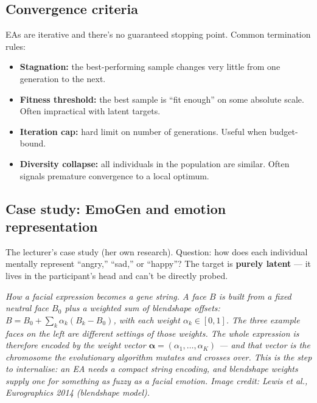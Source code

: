 \documentclass[11pt, a4paper]{article}
\begin{document}
\subsection{Convergence criteria}

EAs are iterative and there's no guaranteed stopping point. Common termination rules:

\begin{itemize}
  \item \textbf{Stagnation:} the best-performing sample changes very little from one generation to the next.
  \item \textbf{Fitness threshold:} the best sample is ``fit enough'' on some absolute scale. Often impractical with latent targets.
  \item \textbf{Iteration cap:} hard limit on number of generations. Useful when budget-bound.
  \item \textbf{Diversity collapse:} all individuals in the population are similar. Often signals premature convergence to a local optimum.
\end{itemize}

\subsection{Case study: EmoGen and emotion representation}

The lecturer's case study (her own research). Question: how does each individual mentally represent ``angry,'' ``sad,'' or ``happy''? The target is \textbf{purely latent} — it lives in the participant's head and can't be directly probed.

\begin{center}

\footnotesize\textit{How a facial expression becomes a \emph{gene string}. A face $B$ is built from a fixed neutral face $B_0$ plus a weighted sum of blendshape offsets: $B = B_0 + \sum_k \alpha_k(B_k - B_0)$, with each weight $\alpha_k \in [0,1]$. The three example faces on the left are different settings of those weights. The whole expression is therefore encoded by the weight vector $\boldsymbol{\alpha}=(\alpha_1,\dots,\alpha_K)$ --- and \emph{that vector is the chromosome} the evolutionary algorithm mutates and crosses over. This is the step to internalise: an EA needs a compact string encoding, and blendshape weights supply one for something as fuzzy as a facial emotion. Image credit: Lewis et al., Eurographics 2014 (blendshape model).}
\end{center}
\end{document}
